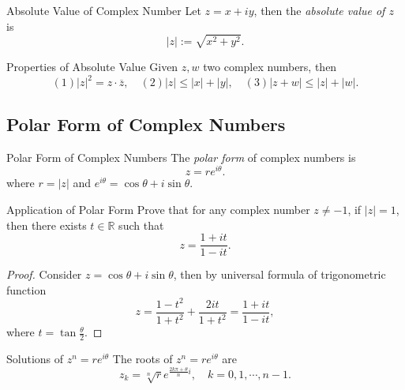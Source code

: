 \begin{definition}{Absolute Value of Complex Number}{}
  Let $z = x + iy$, then the \emph{absolute value of $z$} is
  \begin{equation}
    |z| := \sqrt{x^2 + y^2}.
  \end{equation}
\end{definition}

\begin{proposition}{Properties of Absolute Value}{}
  Given $z, w$ two complex numbers, then
  \begin{equation}
    (1) |z|^2 = z \cdot \overline{z}, \quad
    (2) |z| \leq |x| + |y|, \quad
    (3) |z + w| \leq |z| + |w|.
  \end{equation}
\end{proposition}


\subsection{Polar Form of Complex Numbers}

\begin{definition}{Polar Form of Complex Numbers}{}
  The \emph{polar form} of complex numbers is
  \begin{equation}
    z = r e^{i\theta}.
  \end{equation}
  where $r = |z|$ and $e^{i\theta} = \cos \theta + i \sin \theta$.
\end{definition}

\begin{example}{Application of Polar Form}{}
  Prove that for any complex number $z \neq -1$, if $|z| = 1$,
  then there exists $t \in \mathbb{R}$ such that
  \begin{equation}
    z = \frac{1 + it}{1 - it}.
  \end{equation}
\end{example}

\begin{proof}
  Consider $z = \cos \theta + i \sin \theta$, then by universal formula of
  trigonometric function
  \begin{equation}
    z = \frac{1 - t^2}{1 + t^2} + \frac{2i t}{1 + t^2} = \frac{1+it}{1 - it},
  \end{equation}
  where $t = \tan \frac{\theta}{2}$.
\end{proof}

\begin{proposition}{Solutions of $z^n = re^{i\theta}$}{}
  The roots of $z^n = re^{i\theta}$ are
  \begin{equation}
    z_k = \sqrt[n]{r} e^{\frac{2k\pi + \theta}{n}i}, \quad k = 0,1,\cdots,n-1.
  \end{equation}
\end{proposition}

